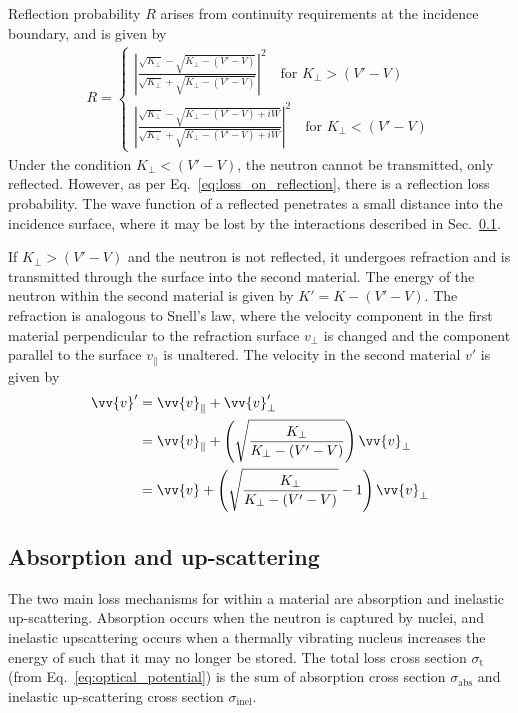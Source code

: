 Reflection probability $R$ arises from continuity requirements at the incidence boundary, and is given by~\cite{golubUCN, schreyer_thesis}
%
\begin{gather}
    R = \begin{cases}
        \left| \frac{\sqrt{K_\perp}-\sqrt{K_\perp - (V'-V)}}{\sqrt{K_\perp} + \sqrt{K_\perp - (V'-V)}}\right|^2 \quad \text{for } K_\perp > (V'-V) \\
        \left| \frac{\sqrt{K_\perp}-\sqrt{K_\perp - (V'-V) + iW}}{\sqrt{K_\perp} + \sqrt{K_\perp - (V'-V) + iW}} \right|^2 \quad \text{for } K_\perp < (V'-V) \label{eq:loss_on_reflection}
    \end{cases}
\end{gather}
%
Under the condition $K_\perp < (V'-V)$, the neutron cannot be transmitted, only reflected. However, as per Eq.~\ref{eq:loss_on_reflection}, there is a reflection loss probability. The wave function of a reflected \ucn penetrates a small distance into the incidence surface, where it may be lost by the interactions described in Sec.~\ref{sec:ucn_absorption}.

If $K_\perp > (V'-V)$ and the neutron is not reflected, it undergoes refraction and is transmitted through the surface into the second material. The energy of the neutron within the second material is given by $K'=K-(V'-V)$. The refraction is analogous to Snell's law, where the velocity component in the first material perpendicular to the refraction surface $v_\perp$ is changed and the component parallel to the surface $v_\parallel$ is unaltered. The velocity in the second material $v'$ is given by
%
\begin{align}
    \vv{v}' &= \vv{v}_\parallel+ \vv{v}'_\perp \\
    &= \vv{v}_\parallel + \left( \sqrt{\frac{K_\perp}{K_\perp - (V'-V)}} \right)\vv{v}_\perp \\
    &= \vv{v} + \left( \sqrt{\frac{K_\perp}{K_\perp - (V'-V)}} - 1 \right)\vv{v}_\perp
\end{align}


\subsection{Absorption and up-scattering}\label{sec:ucn_absorption}


The two main loss mechanisms for \ucn within a material are absorption and inelastic up-scattering. Absorption occurs when the neutron is captured by nuclei, and inelastic upscattering occurs when a thermally vibrating nucleus increases the energy of \ucn such that it may no longer be stored. The total loss cross section $\sigma_{\text{t}}$ (from Eq.~\ref{eq:optical_potential}) is the sum of absorption cross section $\sigma_\text{abs}$ and inelastic up-scattering cross section $\sigma_\text{inel}$.

